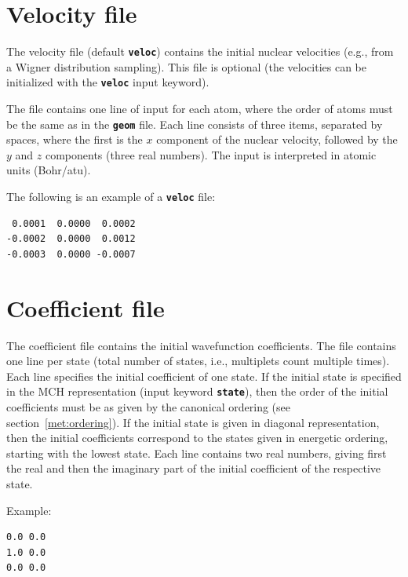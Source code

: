 \documentclass[a4paper,11pt,DIV=15,openany,twoside=false]{scrbook}
\newcommand{\ttt}[1]{\textbf{\texttt{#1}}}
\newenvironment{example}{
  \vspace{0mm}
  \definecolor{shadecolor}{HTML}{E4F4FF}
  \begin{shaded}
}{
  \end{shaded}
}
\begin{document}
\section{Velocity file}\label{sec:velocfile}

The velocity file (default \ttt{veloc}) contains the initial nuclear velocities (e.g., from a Wigner distribution sampling). This file is optional (the velocities can be initialized with the \ttt{veloc} input keyword). 

The file contains one line of input for each atom, where the order of atoms must be the same as in the \ttt{geom} file. Each line consists of three items, separated by spaces, where the first is the $x$ component of the nuclear velocity, followed by the $y$ and $z$ components (three real numbers). The input is interpreted in atomic units (Bohr/atu).

The following is an example of a \ttt{veloc} file:
\begin{example}
  \begin{verbatim}
 0.0001  0.0000  0.0002
-0.0002  0.0000  0.0012
-0.0003  0.0000 -0.0007
  \end{verbatim}
\end{example}

\section{Coefficient file}\label{sec:coefffile}

The coefficient file contains the initial wavefunction coefficients. The file contains one line per state (total number of states, i.e., multiplets count multiple times). Each line specifies the initial coefficient of one state. If the initial state is specified in the MCH representation (input keyword \ttt{state}), then the order of the initial coefficients must be as given by the canonical ordering (see section~\ref{met:ordering}). If the initial state is given in diagonal representation, then the initial coefficients correspond to the states given in energetic ordering, starting with the lowest state.
Each line contains two real numbers, giving first the real and then the imaginary part of the initial coefficient of the respective state.

Example:
\begin{example}
  \begin{verbatim}
0.0 0.0
1.0 0.0
0.0 0.0
  \end{verbatim}
\end{example}
\end{document}
